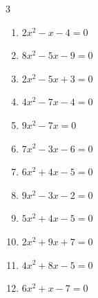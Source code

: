 \begin{multicols}{3}
\begin{enumerate}

  \item $2x^{2}-x-4=0$


  \item $8x^{2}-5x-9=0$


  \item $2x^{2}-5x+3=0$


  \item $4x^{2}-7x-4=0$


  \item $9x^{2}-7x=0$


\columnbreak %

  \item $7x^{2}-3x-6=0$


  \item $6x^{2}+4x-5=0$


  \item $9x^{2}-3x-2=0$


  \item $5x^{2}+4x-5=0$


  \item $2x^{2}+9x+7=0$


  \item $4x^{2}+8x-5=0$


  \item $6x^{2}+x-7=0$



\end{enumerate}
\end{multicols}
